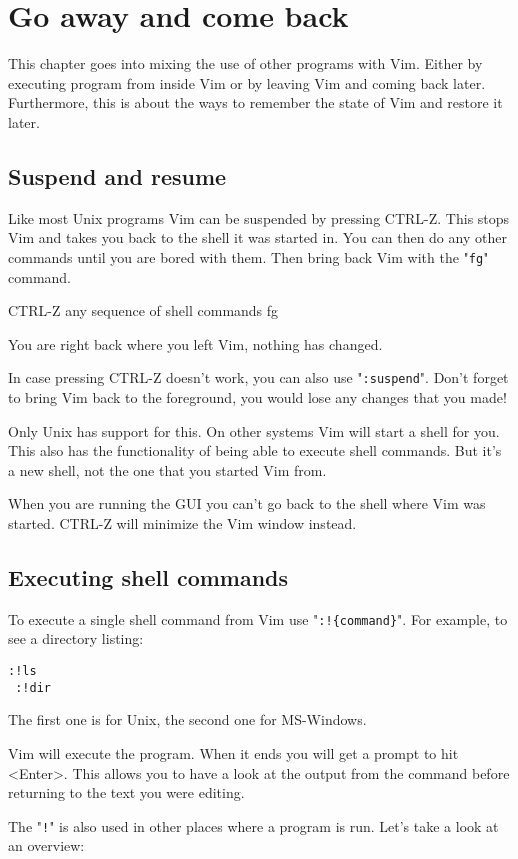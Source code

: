 \section{Go away and come back}
This chapter goes into mixing the use of other programs with Vim.
Either by executing program from inside Vim or by leaving Vim and coming back later.
Furthermore, this is about the ways to remember the state of Vim and restore it later.
\subsection{Suspend and resume}
Like most Unix programs Vim can be suspended by pressing CTRL-Z.
This stops Vim and takes you back to the shell it was started in.
You can then do any other commands until you are bored with them.
Then bring back Vim with the "\verb!fg!" command.

 CTRL-Z
 {any sequence of shell commands}
 fg

You are right back where you left Vim, nothing has changed.

In case pressing CTRL-Z doesn't work, you can also use "\verb!:suspend!".
Don't forget to bring Vim back to the foreground, you would lose any changes that you made!

Only Unix has support for this.
On other systems Vim will start a shell for you.
This also has the functionality of being able to execute shell commands.
But it's a new shell, not the one that you started Vim from.

When you are running the GUI you can't go back to the shell where Vim was started.
CTRL-Z will minimize the Vim window instead.
\subsection{Executing shell commands}
To execute a single shell command from Vim use "\verb,:!{command},".
For example, to see a directory listing:

\begin{Verbatim}[samepage=true]
 :!ls
 :!dir
\end{Verbatim}

The first one is for Unix, the second one for MS-Windows.

Vim will execute the program.
When it ends you will get a prompt to hit <Enter>.
This allows you to have a look at the output from the command before returning to the text you were editing.

The "\verb:!:" is also used in other places where a program is run.
Let's take a look at an overview:

